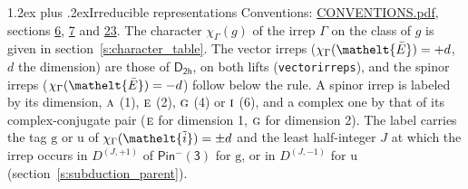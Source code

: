 \documentclass[10pt,a4paper]{article}
\makeatletter
\renewcommand\section{\@startsection{section}{1}{\z@}{-3ex plus -1ex minus -.2ex}%
  {1.2ex plus .2ex}{\normalfont\large\sffamily\bfseries\color{parttitle}}}
\numberwithin{equation}{section}
\newcommand{\eltfont}[1]{{\let\sigma\eltsigma\mathelt{#1}}}
\newcommand{\grp}[1]{\mathsf{#1}}
\newcommand{\irr}[1]{\text{\normalfont\scshape #1}}
\newcommand{\elt}[1]{\eltfont{#1}}
\newcommand{\ptag}[1]{\mathrm{#1}}
\newcommand{\irrJp}[2]{D^{(#1,#2)}}
\newcommand{\irchar}[1]{\chi_{#1}}
\newcommand{\barred}[1]{\bar{#1}}
\newcommand{\lift}[1]{\tilde{#1}}
\makeatother
\begin{document}
\section{Irreducible representations}\label{s:irreps}
Conventions: \href{../../CONVENTIONS.pdf}{CONVENTIONS.pdf}, sections \href{../../../rotation/CONVENTIONS.pdf\#conv.6}{6}, \href{../../../rotation/CONVENTIONS.pdf\#conv.7}{7} and \href{../../CONVENTIONS.pdf\#conv.23}{23}.
\leavevmode\label{n:function.character}\label{n:irrep.Gamma}The character $\irchar{\Gamma}(g)$ of the irrep $\Gamma$ on the class of $g$ is given in section~\ref{s:character_table}. \label{n:index.dimension}The vector irreps ($\irchar{\Gamma}(\elt{\barred{E}}) = +d$, $d$ the dimension) are those of \href{../../../rotation/data/pdf/D2h.pdf}{$\grp{D_{2h}}$}, on both lifts (\texttt{vectorirreps}), and the spinor irreps ($\irchar{\Gamma}(\elt{\barred{E}}) = -d$) follow below the rule. A spinor irrep is labeled by its dimension, $\irr{a}$ (1), $\irr{e}$ (2), $\irr{g}$ (4) or $\irr{i}$ (6), and a complex one by that of its complex-conjugate pair ($\irr{e}$ for dimension 1, $\irr{g}$ for dimension 2). The label carries the tag $\ptag{g}$ or $\ptag{u}$ of $\irchar{\Gamma}(\elt{\lift{i}}) = \pm d$ and the least half-integer $J$ at which the irrep occurs in $\irrJp{J}{+1}$ of $\grp{Pin^{-}(3)}$ for $\ptag{g}$, or in $\irrJp{J}{-1}$ for $\ptag{u}$ (section~\ref{s:subduction_parent}).
\end{document}
